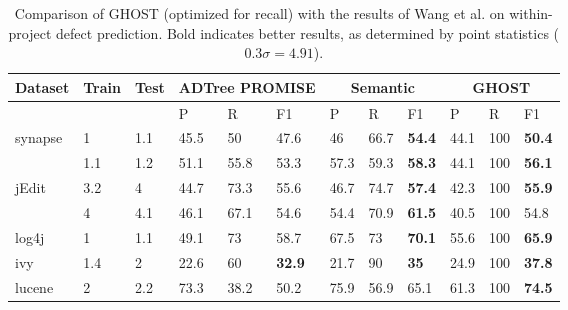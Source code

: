 \begin{table*}[ht!]
\centering
\caption{Comparison of GHOST (optimized for recall) with the results of Wang et al. \cite{wang2016automatically} on within-project defect prediction. Bold indicates better results, as determined by point statistics ($0.3 \sigma = 4.91$).}
\label{tab:wpdp}
\begin{tabular}{l|ll|lll|lll|lll}
\toprule
Dataset & Train & Test & \multicolumn{3}{c}{ADTree PROMISE} & \multicolumn{3}{c}{Semantic} & \multicolumn{3}{c}{GHOST}    \\
\midrule
                         &                        &                       & P    & R    & F1                   & P    & R    & F1             & P    & R    & F1                \\
                         \midrule
\multirow{2}{*}{synapse} & 1                      & 1.1                   & 45.5 & 50   & 47.6                 & 46   & 66.7 & \cellcolor{blue!10}\textbf{54.4}           & 44.1 & 100  & \cellcolor{blue!10}\textbf{50.4}              \\
                         & 1.1                    & 1.2                   & 51.1 & 55.8 & 53.3                 & 57.3 & 59.3 & \cellcolor{blue!10}\textbf{58.3}           & 44.1 & 100  & \cellcolor{blue!10}\textbf{56.1}              \\
                         \midrule
\multirow{2}{*}{jEdit}   & 3.2                    & 4                     & 44.7 & 73.3 & 55.6                 & 46.7 & 74.7 & \cellcolor{blue!10}\textbf{57.4}           & 42.3 & 100  & \cellcolor{blue!10}\textbf{55.9}              \\
                         & 4                      & 4.1                   & 46.1 & 67.1 & 54.6                 & 54.4 & 70.9 & \cellcolor{blue!10}\textbf{61.5}           & 40.5 & 100  & 54.8              \\ \midrule
log4j                    & 1                      & 1.1                   & 49.1 & 73   & 58.7                 & 67.5 & 73   & \cellcolor{blue!10}\textbf{70.1}           & 55.6 & 100  & \cellcolor{blue!10}\textbf{65.9}              \\ \midrule
ivy                      & 1.4                    & 2                     & 22.6 & 60   & \cellcolor{blue!10}\textbf{32.9}                 & 21.7 & 90   & \cellcolor{blue!10}\textbf{35}             & 24.9 & 100  & \cellcolor{blue!10}\textbf{37.8}              \\ \midrule
\multirow{2}{*}{lucene}  & 2                      & 2.2                   & 73.3 & 38.2 & 50.2                 & 75.9 & 56.9 & 65.1           & 61.3 & 100  & \cellcolor{blue!10}\textbf{74.5}              \\

\end{tabular}
\end{table*}
